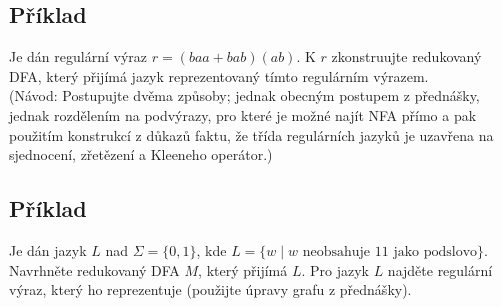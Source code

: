 \subsection{Příklad}
Je dán regulární výraz $r=(baa + bab) (ab)$. K $r$ zkonstruujte redukovaný DFA, který přijímá jazyk reprezentovaný tímto regulárním výrazem.\\
(Návod: Postupujte dvěma způsoby; jednak obecným postupem z přednášky, jednak rozdělením na podvýrazy, pro které je možné najít NFA přímo a pak použitím konstrukcí z důkazů faktu, že třída regulárních jazyků je uzavřena na sjednocení, zřetězení a Kleeneho operátor.)

\subsection{Příklad}
Je dán jazyk $L$ nad $\Sigma = \{0,1\}$, kde $L = \{w \mid w \text{ neobsahuje } 11 \text{ jako podslovo}\}$. Navrhněte redukovaný DFA $M$, který přijímá $L$. Pro jazyk $L$ najděte regulární výraz, který ho reprezentuje (použijte úpravy grafu z přednášky).